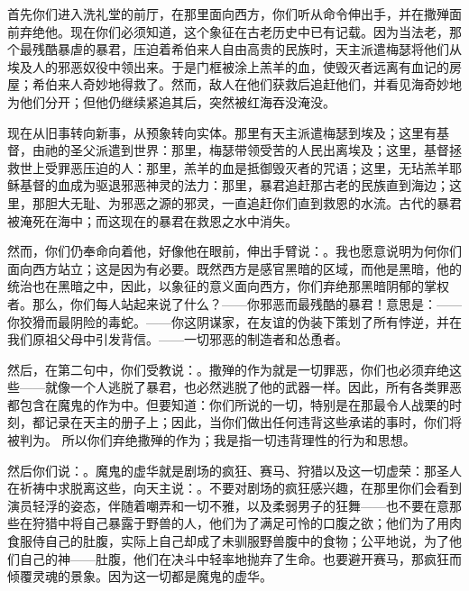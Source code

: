 首先你们进入洗礼堂的前厅，在那里面向西方，你们听从命令伸出手，并在撒殚面前弃绝他。现在你们必须知道，这个象征在古老历史中已有记载。因为当法老，那个最残酷暴虐的暴君，压迫着希伯来人自由高贵的民族时，天主派遣梅瑟将他们从埃及人的邪恶奴役中领出来。于是门框被涂上羔羊的血，使毁灭者远离有血记的房屋；希伯来人奇妙地得救了。然而，敌人在他们获救后追赶他们，并看见海奇妙地为他们分开；但他仍继续紧追其后，突然被红海吞没淹没。\par

现在从旧事转向新事，从预象转向实体。那里有天主派遣梅瑟到埃及；这里有基督，由祂的圣父派遣到世界：那里，梅瑟带领受苦的人民出离埃及；这里，基督拯救世上受罪恶压迫的人：那里，羔羊的血是抵御毁灭者的咒语；这里，无玷羔羊耶稣基督的血成为驱退邪恶神灵的法力：那里，暴君追赶那古老的民族直到海边；这里，那胆大无耻、为邪恶之源的邪灵，一直追赶你们直到救恩的水流。古代的暴君被淹死在海中；而这现在的暴君在救恩之水中消失。\par

然而，你们仍奉命向着他，好像他在眼前，伸出手臂说：。我也愿意说明为何你们面向西方站立；这是因为有必要。既然西方是感官黑暗的区域，而他是黑暗，他的统治也在黑暗之中，因此，以象征的意义面向西方，你们弃绝那黑暗阴郁的掌权者。那么，你们每人站起来说了什么？——你邪恶而最残酷的暴君！意思是：——你狡猾而最阴险的毒蛇。——你这阴谋家，在友谊的伪装下策划了所有悖逆，并在我们原祖父母中引发背信。——一切邪恶的制造者和怂恿者。\par

然后，在第二句中，你们受教说：。撒殚的作为就是一切罪恶，你们也必须弃绝这些——就像一个人逃脱了暴君，也必然逃脱了他的武器一样。因此，所有各类罪恶都包含在魔鬼的作为中。但要知道：你们所说的一切，特别是在那最令人战栗的时刻，都记录在天主的册子上；因此，当你们做出任何违背这些承诺的事时，你们将被判为。 所以你们弃绝撒殚的作为；我是指一切违背理性的行为和思想。\par

然后你们说：。魔鬼的虚华就是剧场的疯狂、赛马、狩猎以及这一切虚荣：那圣人在祈祷中求脱离这些，向天主说：。不要对剧场的疯狂感兴趣，在那里你们会看到演员轻浮的姿态，伴随着嘲弄和一切不雅，以及柔弱男子的狂舞——也不要在意那些在狩猎中将自己暴露于野兽的人，他们为了满足可怜的口腹之欲；他们为了用肉食服侍自己的肚腹，实际上自己却成了未驯服野兽腹中的食物；公平地说，为了他们自己的神——肚腹，他们在决斗中轻率地抛弃了生命。也要避开赛马，那疯狂而倾覆灵魂的景象。因为这一切都是魔鬼的虚华。\par

